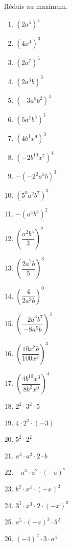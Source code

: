 \documentclass[12pt,parskip=half-, twoside=semi]{scrartcl}
\begin{document}
\begin{exercise}
  Réduis au maximum.
  \begin{enumerate}[cols=3, itemsep=1em]
    
      \item \(\left( 2a^{5} \right)^{4} \)
      \item \(\left( 4x^{4} \right)^{3} \)
      \item \(\left( 2a^{7} \right)^{5} \)
      \item \(\left( 2a^{3}b \right)^{3} \)
      \item \(\left( - 3a^{5}b^{2} \right)^{4} \)
      \item \(\left( 5a^{7}b^{3} \right)^{3} \)
      \item \(\left( 4b^{3}x^{9} \right)^{3} \)
      \item \(\left( - 2b^{10}x^{7} \right)^{4} \)
      \item \(- \left( - 2^{2}a^{3}b \right)^{3} \)
      \item \(\left( 5^{0}a^{2}b^{7} \right)^{3} \)
      \item \(- \left( a^{4}b^{3} \right)^{2} \)
      \item \(\left( \dfrac{a^{2}b^{5}}{3} \right)^{2} \)
      \item \(\left( \dfrac{{2a}^{7}b}{5} \right)^{3} \)
      \item \(\left( \dfrac{4}{2a^{3}b} \right)^{0} \)
      \item \(\left( \dfrac{{- 2a}^{3}b^{7}}{- 8a^{5}b} \right)^{3} \)
      \item \(\left( \dfrac{{10x}^{8}b}{100x^{4}} \right)^{3} \)
      \item \(\left( \dfrac{{4b}^{10}x^{3}}{8b^{2}x^{0}} \right)^{4} \)
      \item \(2^{2} \cdot 3^{2} \cdot 5 \)
      \item \(4 \cdot 2^{2} \cdot ( - 3) \)
      \item \(5^{2} \cdot 2^{2} \)
      \item \(a^{3} \cdot a^{2} \cdot 2 \cdot b \)
      \item \(- a^{3} \cdot a^{2} \cdot ( - a)^{2} \)
      \item \(b^{2} \cdot x^{3} \cdot ( - x)^{2} \)
      \item \(3^{3} \cdot x^{3} \cdot 2 \cdot ( - x)^{3} \)
      \item \(a^{5} \cdot ( - a)^{3} \cdot 5^{2} \)
      \item \(( - 4)^{2} \cdot 3 \cdot a^{4} \)
  \end{enumerate}
\end{exercise}
\end{document}
